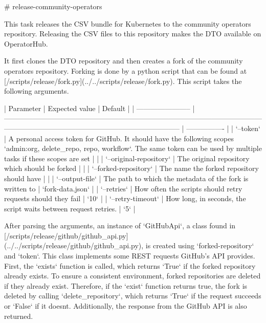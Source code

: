# release-community-operators

This task releases the CSV bundle for Kubernetes to the community operators repository.
Releasing the CSV files to this repository makes the DTO available on OperatorHub.

It first clones the DTO repository and then creates a fork of the community operators repository.
Forking is done by a python script that can be found at [/scripts/release/fork.py](../../scripts/release/fork.py).
This script takes the following arguments.

| Parameter               | Expected value                                                                                                                                                                         | Default          |
| ----------------------- | -------------------------------------------------------------------------------------------------------------------------------------------------------------------------------------- | ---------------- |
| `--token`               | A personal access token for GitHub. It should have the following scopes `admin:org, delete_repo, repo, workflow`. The same token can be used by multiple tasks if these scopes are set |                  |
| `--original-repository` | The original repository which should be forked                                                                                                                                         |                  |
| `--forked-repository`   | The name the forked repository should have                                                                                                                                             |                  |
| `--output-file`         | The path to which the metadata of the fork is written to                                                                                                                               | `fork-data.json` |
| `--retries`             | How often the scripts should retry requests should they fail                                                                                                                           | `10`             |
| `--retry-timeout`       | How long, in seconds, the script waits between request retries.                                                                                                                        | `5`              |

After parsing the arguments, an instance of `GitHubApi`, a class found in [/scripts/release/github/github_api.py](../../scripts/release/github/github_api.py), is created using `{forked-repository}` and `{token}`.
This class implements some REST requests GitHub's API provides.
First, the `exists` function is called, which returns `True` if the forked repository already exists.
To ensure a consistent environment, forked repositories are deleted if they already exist.
Therefore, if the `exist` function returns true, the fork is deleted by calling `delete_repository`, which returns `True` if the request succeeds or `False` if it doesnt.
Additionally, the response from the GitHub API is also returned.

